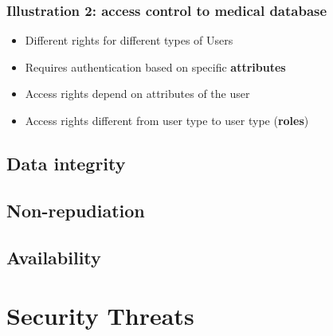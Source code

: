 \documentclass[11pt,british,faculty=ea,layout=titlefont,underline=false,titleUppercase=true,titleUnderline=true,hidelinks]{ugent2016-report}
\begin{document}
            \subsubsection{Illustration 2: access control to medical database} \label{subsub:access-control-to-medical-database}
                \begin{itemize}
                    \item Different rights for different types of Users
                    \item Requires authentication based on specific \textbf{attributes}
                    \item Access rights depend on attributes of the user
                    \item Access rights different from user type to user type (\textbf{roles})
                \end{itemize}


		\subsection{Data integrity} \label{sub:data-integrity}

		\subsection{Non-repudiation} \label{sub:non-repudiation}

		\subsection{Availability} \label{sub:availability}


	\section{Security Threats} \label{sec:security-threats}


\printbibliography
\end{document}
